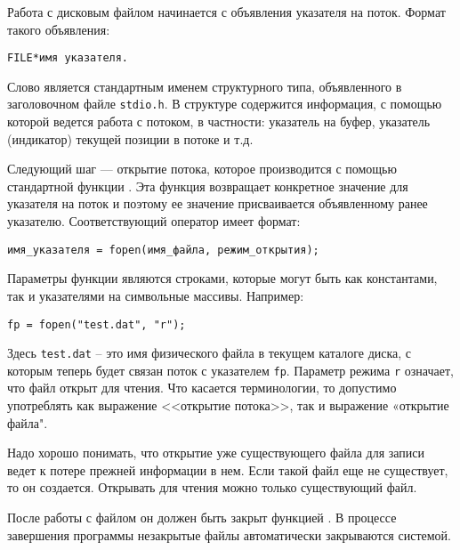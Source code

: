 Работа с дисковым файлом начинается с объявления указателя на поток. Формат такого объявления:
\begin{verbatim}
FILE*имя указателя.
\end{verbatim}

Слово  является стандартным именем структурного типа, объявленного в заголовочном файле \verb|stdio.h|.
В структуре  содержится информация, с помощью которой ведется работа с потоком, в частности: указатель
на буфер, указатель (индикатор) текущей позиции в потоке и т.д.

Следующий шаг --- открытие потока, которое производится с помощью стандартной функции . Эта функция
возвращает конкретное значение для указателя на поток и поэтому ее значение присваивается объявленному ранее указателю.
Соответствующий оператор имеет формат:
\begin{verbatim}
имя_указателя = fopen(имя_файла, режим_открытия);
\end{verbatim}

Параметры функции  являются строками, которые могут быть как константами, так и указателями на символьные массивы. Например:

\begin{verbatim}
fp = fopen("test.dat", "r");
\end{verbatim}

Здесь \verb|test.dat| – это имя физического файла в текущем каталоге диска, с которым теперь будет связан поток с указателем \verb|fp|.
Параметр режима \verb|r| означает, что файл открыт для чтения. Что касается терминологии, то допустимо употреблять как выражение
<<открытие потока>>, так и выражение «открытие файла".

Надо хорошо понимать, что открытие уже существующего файла для записи ведет к потере прежней информации в нем. Если такой файл еще
не существует, то он создается. Открывать для чтения можно только существующий файл.

После работы с файлом он должен быть закрыт функцией . В процессе завершения программы незакрытые файлы автоматически закрываются системой.

